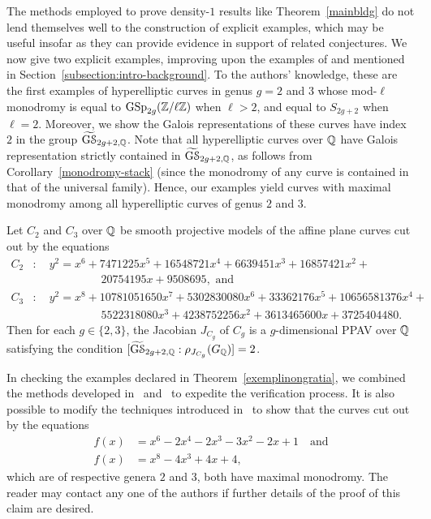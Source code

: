 The methods employed to prove density-$1$ results like Theorem~\ref{mainbldg} do not lend themselves well to the construction of explicit examples, which may be useful insofar as they can provide evidence in support of related conjectures. 
We now give two explicit examples, improving upon the examples of \cite{dooleyfat} and \cite{anni2016residual} mentioned in Section~\ref{subsection:intro-background}.
To the authors' knowledge,
these are the first examples of hyperelliptic curves in genus $g = 2$ and $3$
whose mod-$\ell$ monodromy is equal to 
$\operatorname{GSp}_{2g}({\mathbb Z}/\ell{\mathbb Z})$ when $\ell > 2$,
and equal to $S_{2g+2}$ when $\ell = 2$.
Moreover, we show the Galois representations of
these curves have index $2$ in the group
$\widetilde{\mathrm{G} \mathcal {S}}_{2{g}+2, \mathbb Q}$. Note that all hyperelliptic
curves over ${\mathbb Q}$ have Galois representation
strictly contained in $\widetilde{\mathrm{G} \mathcal {S}}_{2{g}+2, \mathbb Q}$,
as follows from
Corollary~\ref{monodromy-stack} (since the monodromy of any curve
is contained in that of the universal family).
Hence, our examples yield curves with
maximal monodromy among all hyperelliptic curves
of genus $2$ and $3$.

\begin{theorem}\label{exemplinongratia}
Let $C_2$ and $C_3$ over $\mathbb Q$ be smooth projective models of the affine plane curves cut out by the equations
\begin{align*}
C_2 & : \quad y^2 = x^6 + 7471225x^5 + 16548721x^4 + 6639451x^3 + 16857421x^2 + \\
& \qquad \qquad \qquad 20754195x +9508695, \text{ and} \\
C_3 & : \quad y^2 = x^8 + 10781051650x^7 + 5302830080x^6 + 33362176x^5 + 10656581376x^4  + \\
& \qquad \qquad \qquad 5522318080x^3 + 4238752256x^2  + 3613465600x  + 3725404480.
\end{align*}
Then for each $g \in \{2, 3\}$, the Jacobian $J_{C_g}$ of $C_g$ is a $g$-dimensional PPAV over $\mathbb Q$ satisfying the condition $[\widetilde{\mathrm{G} \mathcal {S}}_{2{g}+2, \mathbb Q} : \rho_{J_{C_g}}(G_\mathbb Q)] = 2$. \end{theorem}
\begin{remark}
In checking the examples declared in Theorem~\ref{exemplinongratia}, we combined the methods developed in~\cite{anni2017constructing} and~\cite{seaweed} to expedite the verification process. It is also possible to modify the techniques introduced in~\cite{seaweed} to show that the curves cut out by the equations
\begin{align}
f(x) & = x^6 - 2x^4 - 2x^3 - 3x^2 - 2x + 1 \quad \text{and} \\
f(x) & = x^8 -4x^3 + 4x + 4,
\end{align}
which are of respective genera $2$ and $3$, both have maximal monodromy. The reader may contact any one of the authors if further details of the proof of this claim are desired.
\end{remark}

